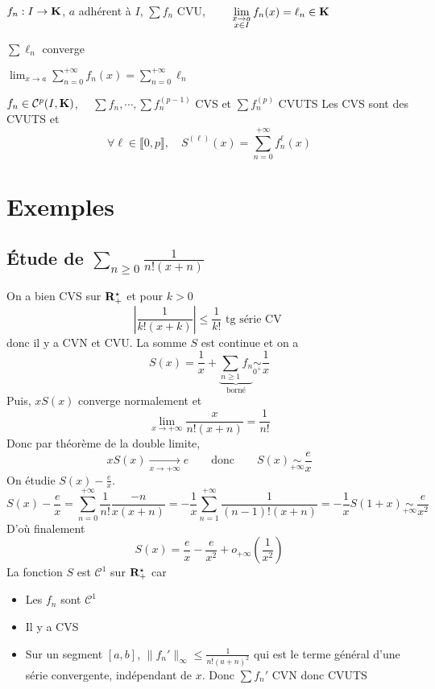 \begin{prop}
    \Hyp $f_n : I \to  \mathbf K$, $a$ adhérent à  $I$,  $\sum f_n$ CVU,  $ \qquad \displaystyle\lim_{\substack{x\to a\\x \in  I}}f_n(x)=\ell _n \in  \mathbf K$
    \begin{concenum}
    \item $\sum \ell _n$ converge
    \item $\displaystyle \lim_{x\to a}\sum_{n=0}^{+\infty}f_n(x)=\sum_{n=0}^{+\infty}\ell _n$
    \end{concenum}
\end{prop}

\begin{prop}
    \Hyp $f_n \in  \mathcal  C^p(I, \mathbf K)$, $ \quad \sum f_n, \cdots , \sum f_n^{(p-1)}$ CVS et $\sum f_n^{(p)}$ CVUTS
    \Conc Les CVS sont des CVUTS et  \[
        \forall  \ell  \in \llbracket 0, p \rrbracket , \quad  S^{(\ell )}(x)= \sum_{n=0}^{+\infty} f_n^{\ell }(x)
    \] 
\end{prop}

\section{Exemples}

\subsection{\texorpdfstring{Étude de $\sum_{n\geq 0}\frac{1}{n!(x+n)}$}{Premier exemple}}

On a bien CVS sur $\mathbf R_+^\star$ et pour $k>0$\[
    \left| \frac{1}{k!(x+k)} \right|\leq \frac{1}{k!} \text{ tg série CV }
\] 
donc il y a CVN et CVU. La somme $S$ est continue et on a  \[
    S(x)=\frac{1}{x}+ \underbrace{\sum_{n\geq 1}f_n}_{\text{borné}} \underset{0^+}\sim \frac{1}{x}
\] 
Puis, $xS(x)$ converge normalement et  \[
    \lim_{x \to  +\infty} \frac{x}{n!(x+n)}=\frac{1}{n!}
\] 
Donc par théorème de la double limite, \[
    xS(x) \xrightarrow[x \to  +\infty]{}e \qquad  \text{donc} \qquad  S(x)\underset{+\infty}\sim \frac{e}{x}
\] 
On étudie $S(x)-\frac{e}{x}$. \[
    S(x)-\frac{e}{x}= \sum_{n=0}^{+\infty} \frac{1}{n!} \frac{-n}{x(x+n)}=-\frac{1}{x} \sum_{n=1}^{+\infty}\frac{1}{(n-1)!(x+n)}=-\frac{1}{x}S(1+x) \underset{+\infty}\sim \frac{e}{x^2}
\] 
D'où finalement \[
    S(x)=\frac{e}{x}-\frac{e}{x^2}+o_{+\infty}\left( \frac{1}{x^2} \right) 
\] 
La fonction $S$ est  $\mathcal  C^1$ sur $\mathbf R_+^\star$ car \begin{itemize}
    \item Les $f_n$ sont  $\mathcal C^1$
    \item Il y a CVS
    \item Sur un segment $[a, b]$, $\|f_n'\|_\infty\leq \frac{1}{n!(a+n)^2}$ qui est le terme général d'une série convergente, indépendant de $x$. Donc  $\sum f_n'$ CVN donc CVUTS
\end{itemize}

